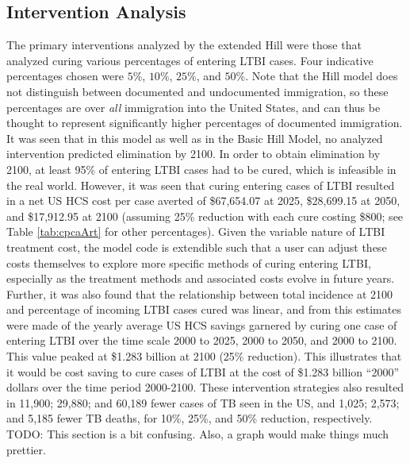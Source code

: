 \documentclass{amsart}
\begin{document}
\subsection{Intervention Analysis}
The primary interventions analyzed by the extended Hill were those that analyzed
curing various percentages of entering LTBI cases. Four indicative percentages
chosen were $5\%$, $10\%$, $25\%$, and $50\%$. Note that the Hill model does not
distinguish between documented and undocumented immigration, so these
percentages are over \emph{all} immigration into the United States, and can thus
be thought to represent significantly higher percentages of documented
immigration. It was seen that in this model as well as in the Basic Hill Model,
no analyzed intervention predicted elimination by 2100. In order to obtain
elimination by 2100, at least 95\% of entering LTBI cases had to be cured, which
is infeasible in the real world. However, it was seen that curing entering cases of
LTBI resulted in a net US HCS cost per case averted of \$67,654.07 at 2025, \$28,699.15 at 2050,
and \$17,912.95 at 2100 (assuming 25\% reduction with each cure costing \$800; see Table
\ref{tab:cpcaArt} for other percentages). Given the variable nature of LTBI
treatment cost, the model code is extendible such that a user can adjust these
costs themselves to explore more specific methods of curing entering LTBI,
especially as the treatment methods and associated costs evolve in future years.
Further, it was also found that the relationship between total incidence at 2100
and percentage of incoming LTBI cases cured was linear, and from this estimates
were made of the yearly average US HCS savings garnered by curing one case of
entering LTBI over the time scale 2000 to 2025, 2000 to 2050, and 2000 to 2100.
This value peaked at \$1.283 billion at 2100 (25\% reduction). This illustrates
that it would be cost saving to cure cases of LTBI at the cost of \$1.283
billion ``2000'' dollars over the time period 2000-2100. These intervention
strategies also resulted in 11,900; 29,880; and 60,189 fewer cases of TB seen in
the US, and 1,025; 2,573; and 5,185 fewer TB deaths, for 10\%, 25\%, and 50\%
reduction, respectively.
{\huge \color{red} TODO: This section is a bit confusing. Also, a graph would
make things much prettier.}
\end{document}
